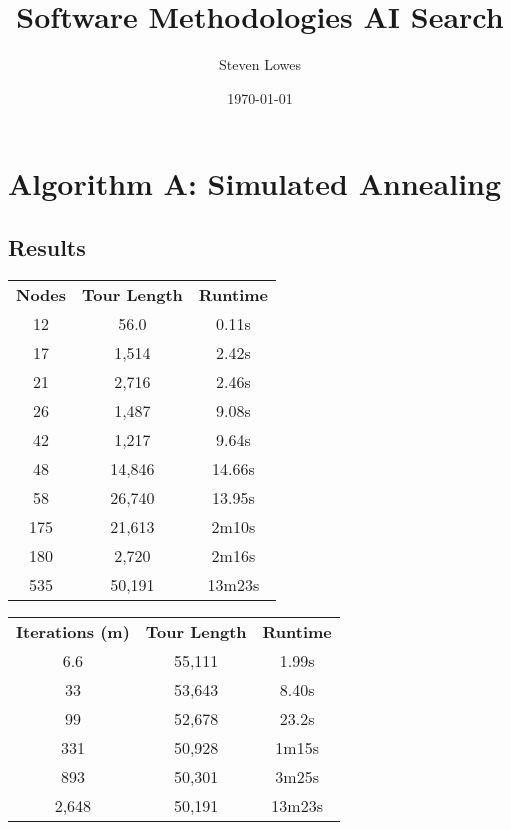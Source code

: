 \documentclass[a4paper, 11pt,table]{article}
\author{Steven Lowes}
\title{Software Methodologies AI Search}
\date{\today{}}
\begin{document}
	
	\section{Algorithm A: Simulated Annealing}
	
	\subsection{Results}
	\label{useCase:annealResults}
	\begin{center}
		\begin{tabu}{|c c c|}
			\textbf{Nodes} & \textbf{Tour Length} & \textbf{Runtime} \\
			12             & 56.0                 & 0.11s            \\
			17             & 1,514                & 2.42s            \\
			21             & 2,716                & 2.46s            \\
			26             & 1,487                & 9.08s            \\
			42             & 1,217                & 9.64s            \\
			48             & 14,846               & 14.66s           \\
			58             & 26,740               & 13.95s           \\
			175            & 21,613               & 2m10s            \\
			180            & 2,720                & 2m16s            \\
			535            & 50,191               & 13m23s           \\
		\end{tabu}
	\end{center}
	
	\begin{center}
		\begin{tabu}{|c c c|}
			\textbf{Iterations (m)} & \textbf{Tour Length} & \textbf{Runtime} \\
			6.6                     & 55,111               & 1.99s            \\
			33                      & 53,643               & 8.40s            \\
			99                      & 52,678               & 23.2s            \\
			331                     & 50,928               & 1m15s            \\
			893                     & 50,301               & 3m25s            \\
			2,648                   & 50,191               & 13m23s           \\
		\end{tabu}
	\end{center}
	
\end{document}
